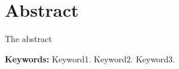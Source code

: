 \thispagestyle{empty}

\chapter*{Abstract}


\vspace*{10mm}

The abstract

\vspace*{15mm}

\textbf{Keywords:} Keyword1.  Keyword2.  Keyword3.